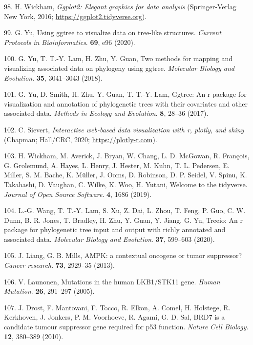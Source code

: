 \documentclass[]{elsarticle} %
\begin{document}
\leavevmode\hypertarget{ref-ggplot22016}{}%
98. H. Wickham, \emph{Ggplot2: Elegant graphics for data analysis} (Springer-Verlag New York, 2016; \url{https://ggplot2.tidyverse.org}).

\leavevmode\hypertarget{ref-ggtree2020}{}%
99. G. Yu, Using ggtree to visualize data on tree-like structures. \emph{Current Protocols in Bioinformatics}. \textbf{69}, e96 (2020).

\leavevmode\hypertarget{ref-ggtree2018}{}%
100. G. Yu, T. T.-Y. Lam, H. Zhu, Y. Guan, Two methods for mapping and visualizing associated data on phylogeny using ggtree. \emph{Molecular Biology and Evolution}. \textbf{35}, 3041--3043 (2018).

\leavevmode\hypertarget{ref-ggtree2017}{}%
101. G. Yu, D. Smith, H. Zhu, Y. Guan, T. T.-Y. Lam, Ggtree: An r package for visualization and annotation of phylogenetic trees with their covariates and other associated data. \emph{Methods in Ecology and Evolution}. \textbf{8}, 28--36 (2017).

\leavevmode\hypertarget{ref-plotly2020}{}%
102. C. Sievert, \emph{Interactive web-based data visualization with r, plotly, and shiny} (Chapman; Hall/CRC, 2020; \url{https://plotly-r.com}).

\leavevmode\hypertarget{ref-tidyverse2019}{}%
103. H. Wickham, M. Averick, J. Bryan, W. Chang, L. D. McGowan, R. François, G. Grolemund, A. Hayes, L. Henry, J. Hester, M. Kuhn, T. L. Pedersen, E. Miller, S. M. Bache, K. Müller, J. Ooms, D. Robinson, D. P. Seidel, V. Spinu, K. Takahashi, D. Vaughan, C. Wilke, K. Woo, H. Yutani, Welcome to the tidyverse. \emph{Journal of Open Source Software}. \textbf{4}, 1686 (2019).

\leavevmode\hypertarget{ref-treeio2020}{}%
104. L.-G. Wang, T. T.-Y. Lam, S. Xu, Z. Dai, L. Zhou, T. Feng, P. Guo, C. W. Dunn, B. R. Jones, T. Bradley, H. Zhu, Y. Guan, Y. Jiang, G. Yu, Treeio: An r package for phylogenetic tree input and output with richly annotated and associated data. \emph{Molecular Biology and Evolution}. \textbf{37}, 599--603 (2020).

\leavevmode\hypertarget{ref-Liang2013}{}%
105. J. Liang, G. B. Mills, AMPK: a contextual oncogene or tumor suppressor? \emph{Cancer research}. \textbf{73}, 2929--35 (2013).

\leavevmode\hypertarget{ref-Launonen2005}{}%
106. V. Launonen, Mutations in the human LKB1/STK11 gene. \emph{Human Mutation}. \textbf{26}, 291--297 (2005).

\leavevmode\hypertarget{ref-Drost2010}{}%
107. J. Drost, F. Mantovani, F. Tocco, R. Elkon, A. Comel, H. Holstege, R. Kerkhoven, J. Jonkers, P. M. Voorhoeve, R. Agami, G. D. Sal, BRD7 is a candidate tumour suppressor gene required for p53 function. \emph{Nature Cell Biology}. \textbf{12}, 380--389 (2010).
\end{document}
